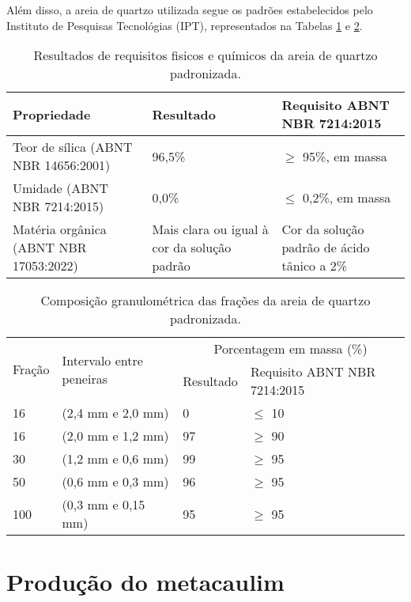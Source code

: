 Além disso, a areia de quartzo utilizada segue os padrões estabelecidos pelo Instituto de Pesquisas Tecnológias (IPT), representados na Tabelas \ref{tab:areia_quartzo_propriedades} e \ref{tab:areia_quartzo_granulometria}.

\begin{table}[H]
    \caption{Resultados de requisitos fisicos e químicos da areia de quartzo padronizada.}
    \label{tab:areia_quartzo_propriedades}
    \center
    \begin{tabular}{p{} p{} p{}}
        \hline
        Propriedade & Resultado & Requisito ABNT NBR 7214:2015 \\
        \hline
        Teor de sílica (ABNT NBR 14656:2001) & 96,5\% & $\geq$ 95\%, em massa \\
        Umidade (ABNT NBR 7214:2015) & 0,0\% & $\leq$ 0,2\%, em massa \\
        Matéria orgânica (ABNT NBR 17053:2022) & Mais clara ou igual à cor da solução padrão & Cor da solução padrão de ácido tânico a 2\% \\
        \hline
    \end{tabular}
\end{table}

\begin{table}[H]
    \caption{Composição granulométrica das frações da areia de quartzo padronizada.}
    \label{tab:areia_quartzo_granulometria}
    \centering
    \begin{tabular}{p{} p{} p{} p{}}
        \hline
        \multirow{2}{=}{Fração} & \multirow{2}{=}{Intervalo entre peneiras} & \multicolumn{2}{c}{Porcentagem em massa (\%)} \\ \cline{3-4}       
        & & Resultado & Requisito ABNT NBR 7214:2015 \\
        \hline
        16 & (2,4 mm e 2,0 mm) & 0 & $\leq$ 10 \\
        16 & (2,0 mm e 1,2 mm) & 97 & $\geq$ 90 \\
        30 & (1,2 mm e 0,6 mm) & 99 & $\geq$ 95 \\
        50 & (0,6 mm e 0,3 mm) & 96 & $\geq$ 95 \\
        100 & (0,3 mm e 0,15 mm) & 95 & $\geq$ 95 \\
        \hline
    \end{tabular}
\end{table}

\section{Produção do metacaulim}
\label{sec:producao_do_metacaulim}

